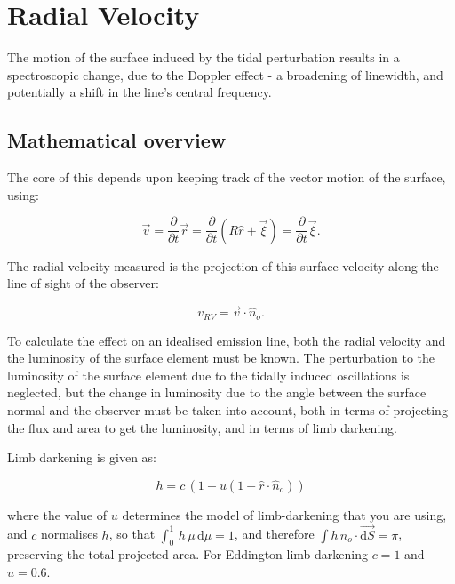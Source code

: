 \documentclass[11pt]{amsart}
\begin{document}
\section{Radial Velocity} \label{RV}

The motion of the surface induced by the tidal perturbation results in a spectroscopic change, due to the Doppler effect - a broadening of linewidth, and potentially a shift in the line's central frequency.

\subsection{Mathematical overview} \label{RV_overview}

The core of this depends upon keeping track of the vector motion of the surface, using:

\begin{equation}
\vec{v} = \frac{\partial}{\partial t} \vec{r} = \frac{\partial}{\partial t} ( R \hat{r} + \vec{\xi} ) = \frac{\partial}{\partial t} \vec{\xi} .
\end{equation}

The radial velocity measured is the projection of this surface velocity along the line of sight of the observer:

\begin{equation}
v_{RV} = \vec{v} \cdot \hat{n}_{o}.
\end{equation}

To calculate the effect on an idealised emission line, both the radial velocity and the luminosity of the surface element must be known.  The perturbation to the luminosity of the surface element due to the tidally induced oscillations is neglected, but the change in luminosity due to the angle between the surface normal and the observer must be taken into account, both in terms of projecting the flux and area to get the luminosity, and in terms of limb darkening.

Limb darkening is given as:

\begin{equation}
h = c \, ( 1 - u (1 - \hat{r} \! \cdot \! \hat{n}_{o}) )
\end{equation}

where the value of $u$ determines the model of limb-darkening that you are using, and $c$ normalises $h$, so that $\int_{0}^{1} \, h \, \mu \, \text{d}\mu = 1$, and therefore $\int h \, \hat{n}_{o} \! \cdot \! \vec{\text{d} S} = \pi$, preserving the total projected area.  For Eddington limb-darkening $c = 1$ and $u = 0.6$.
\end{document}
